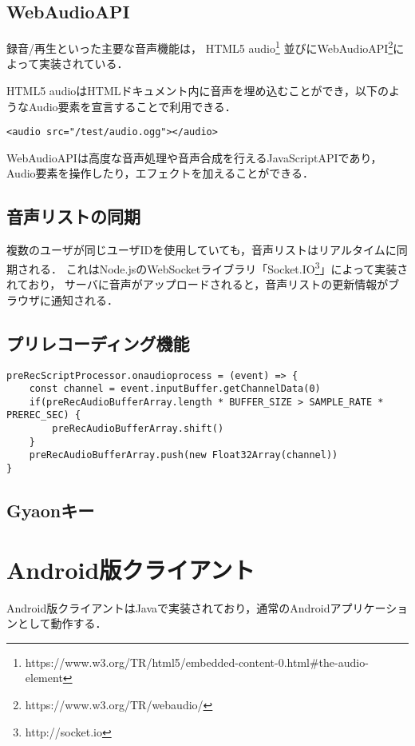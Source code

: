 \subsection{WebAudioAPI}
録音/再生といった主要な音声機能は，
HTML5 audio\footnote{\textsf{https://www.w3.org/TR/html5/embedded-content-0.html\#the-audio-element}}
並びにWebAudioAPI\footnote{\textsf{https://www.w3.org/TR/webaudio/}}によって実装されている．

HTML5 audioはHTMLドキュメント内に音声を埋め込むことができ，以下のようなAudio要素を宣言することで利用できる．

\vspace{4mm}
\begin{lstlisting}
<audio src="/test/audio.ogg"></audio>
\end{lstlisting}

WebAudioAPIは高度な音声処理や音声合成を行えるJavaScriptAPIであり，
Audio要素を操作したり，エフェクトを加えることができる．

\subsection{音声リストの同期}
複数のユーザが同じユーザIDを使用していても，音声リストはリアルタイムに同期される．
これはNode.jsのWebSocketライブラリ「Socket.IO\footnote{\textsf{http://socket.io}}」によって実装されており，
サーバに音声がアップロードされると，音声リストの更新情報がブラウザに通知される．

\subsection{プリレコーディング機能}


\vspace{4mm}
\begin{lstlisting}
preRecScriptProcessor.onaudioprocess = (event) => {
    const channel = event.inputBuffer.getChannelData(0)
    if(preRecAudioBufferArray.length * BUFFER_SIZE > SAMPLE_RATE * PREREC_SEC) {
        preRecAudioBufferArray.shift()
    }
    preRecAudioBufferArray.push(new Float32Array(channel))
}
\end{lstlisting}

\subsection{Gyaonキー}

\section{Android版クライアント}
Android版クライアントはJavaで実装されており，通常のAndroidアプリケーションとして動作する．
